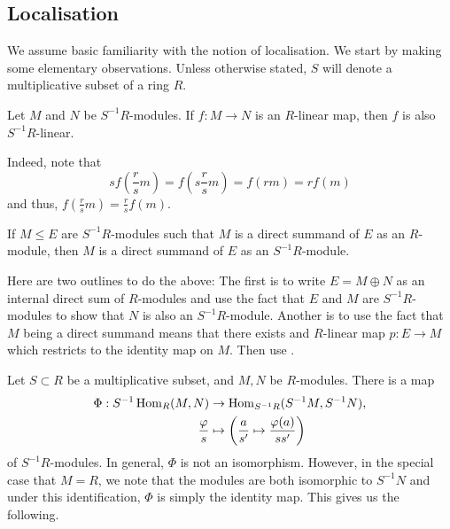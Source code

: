 \subsection{Localisation}

We assume basic familiarity with the notion of localisation. We start by making some elementary observations. Unless otherwise stated, $S$ will denote a multiplicative subset of a ring $R$.

\begin{obs} \label{obs:R-linear-map-between-localised-modules}
	Let $M$ and $N$ be $S^{-1}R$-modules. If $f : M \to N$ is an $R$-linear map, then $f$ is also $S^{-1}R$-linear.

	Indeed, note that
	\begin{equation*} 
		s f\left(\frac{r}{s} m\right) = f\left(s \frac{r}{s} m\right) = f(rm) = r f(m)
	\end{equation*}
	and thus, $f(\frac{r}{s} m) = \frac{r}{s} f(m)$.
\end{obs}

\begin{exe} \label{exe:direct-summand-localised-modules}
	If $M \le E$ are $S^{-1}R$-modules such that $M$ is a direct summand of $E$ as an $R$-module, then $M$ is a direct summand of $E$ as an $S^{-1}R$-module. 
\end{exe}
Here are two outlines to do the above: The first is to write $E = M \oplus N$ as an internal direct sum of $R$-modules and use the fact that $E$ and $M$ are $S^{-1}R$-modules to show that $N$ is also an $S^{-1}R$-module. \newline
Another is to use the fact that $M$ being a direct summand means that there exists and $R$-linear map $p : E \to M$ which restricts to the identity map on $M$. Then use .

Let $S \subset R$ be a multiplicative subset, and $M, N$ be $R$-modules. There is a map 
\begin{align*} 
	\Phi : S^{-1}\operatorname{Hom}_{R}(M, N) &\to \operatorname{Hom}_{S^{-1}R}(S^{-1}M, S^{-1}N), \\
	\frac{\varphi}{s} &\mapsto \left(\frac{a}{s'} \mapsto \frac{\varphi(a)}{ss'} \right)
\end{align*}
of $S^{-1}R$-modules. In general, $\Phi$ is not an isomorphism. However, in the special case that $M = R$, we note that the modules are both isomorphic to $S^{-1}N$ and under this identification, $\Phi$ is simply the identity map. This gives us the following.

